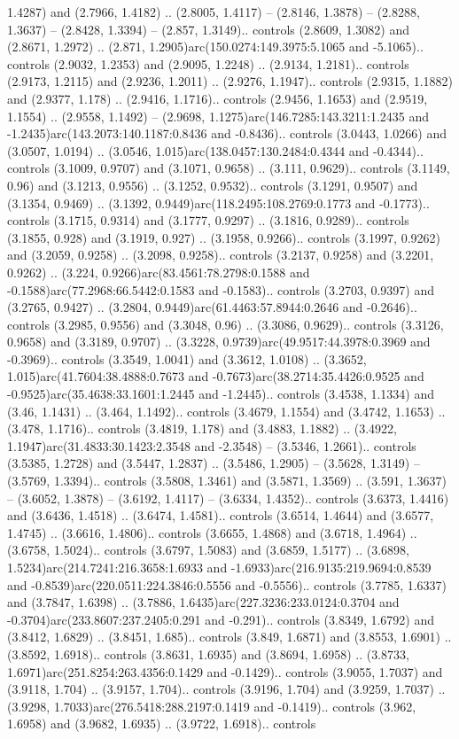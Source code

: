 1.4287) and (2.7966, 1.4182) .. (2.8005, 1.4117) -- (2.8146, 1.3878) -- (2.8288, 1.3637) -- (2.8428, 1.3394) -- (2.857, 1.3149).. controls (2.8609, 1.3082) and (2.8671, 1.2972) .. (2.871, 1.2905)arc(150.0274:149.3975:5.1065 and -5.1065).. controls (2.9032, 1.2353) and (2.9095, 1.2248) .. (2.9134, 1.2181).. controls (2.9173, 1.2115) and (2.9236, 1.2011) .. (2.9276, 1.1947).. controls (2.9315, 1.1882) and (2.9377, 1.178) .. (2.9416, 1.1716).. controls (2.9456, 1.1653) and (2.9519, 1.1554) .. (2.9558, 1.1492) -- (2.9698, 1.1275)arc(146.7285:143.3211:1.2435 and -1.2435)arc(143.2073:140.1187:0.8436 and -0.8436).. controls (3.0443, 1.0266) and (3.0507, 1.0194) .. (3.0546, 1.015)arc(138.0457:130.2484:0.4344 and -0.4344).. controls (3.1009, 0.9707) and (3.1071, 0.9658) .. (3.111, 0.9629).. controls (3.1149, 0.96) and (3.1213, 0.9556) .. (3.1252, 0.9532).. controls (3.1291, 0.9507) and (3.1354, 0.9469) .. (3.1392, 0.9449)arc(118.2495:108.2769:0.1773 and -0.1773).. controls (3.1715, 0.9314) and (3.1777, 0.9297) .. (3.1816, 0.9289).. controls (3.1855, 0.928) and (3.1919, 0.927) .. (3.1958, 0.9266).. controls (3.1997, 0.9262) and (3.2059, 0.9258) .. (3.2098, 0.9258).. controls (3.2137, 0.9258) and (3.2201, 0.9262) .. (3.224, 0.9266)arc(83.4561:78.2798:0.1588 and -0.1588)arc(77.2968:66.5442:0.1583 and -0.1583).. controls (3.2703, 0.9397) and (3.2765, 0.9427) .. (3.2804, 0.9449)arc(61.4463:57.8944:0.2646 and -0.2646).. controls (3.2985, 0.9556) and (3.3048, 0.96) .. (3.3086, 0.9629).. controls (3.3126, 0.9658) and (3.3189, 0.9707) .. (3.3228, 0.9739)arc(49.9517:44.3978:0.3969 and -0.3969).. controls (3.3549, 1.0041) and (3.3612, 1.0108) .. (3.3652, 1.015)arc(41.7604:38.4888:0.7673 and -0.7673)arc(38.2714:35.4426:0.9525 and -0.9525)arc(35.4638:33.1601:1.2445 and -1.2445).. controls (3.4538, 1.1334) and (3.46, 1.1431) .. (3.464, 1.1492).. controls (3.4679, 1.1554) and (3.4742, 1.1653) .. (3.478, 1.1716).. controls (3.4819, 1.178) and (3.4883, 1.1882) .. (3.4922, 1.1947)arc(31.4833:30.1423:2.3548 and -2.3548) -- (3.5346, 1.2661).. controls (3.5385, 1.2728) and (3.5447, 1.2837) .. (3.5486, 1.2905) -- (3.5628, 1.3149) -- (3.5769, 1.3394).. controls (3.5808, 1.3461) and (3.5871, 1.3569) .. (3.591, 1.3637) -- (3.6052, 1.3878) -- (3.6192, 1.4117) -- (3.6334, 1.4352).. controls (3.6373, 1.4416) and (3.6436, 1.4518) .. (3.6474, 1.4581).. controls (3.6514, 1.4644) and (3.6577, 1.4745) .. (3.6616, 1.4806).. controls (3.6655, 1.4868) and (3.6718, 1.4964) .. (3.6758, 1.5024).. controls (3.6797, 1.5083) and (3.6859, 1.5177) .. (3.6898, 1.5234)arc(214.7241:216.3658:1.6933 and -1.6933)arc(216.9135:219.9694:0.8539 and -0.8539)arc(220.0511:224.3846:0.5556 and -0.5556).. controls (3.7785, 1.6337) and (3.7847, 1.6398) .. (3.7886, 1.6435)arc(227.3236:233.0124:0.3704 and -0.3704)arc(233.8607:237.2405:0.291 and -0.291).. controls (3.8349, 1.6792) and (3.8412, 1.6829) .. (3.8451, 1.685).. controls (3.849, 1.6871) and (3.8553, 1.6901) .. (3.8592, 1.6918).. controls (3.8631, 1.6935) and (3.8694, 1.6958) .. (3.8733, 1.6971)arc(251.8254:263.4356:0.1429 and -0.1429).. controls (3.9055, 1.7037) and (3.9118, 1.704) .. (3.9157, 1.704).. controls (3.9196, 1.704) and (3.9259, 1.7037) .. (3.9298, 1.7033)arc(276.5418:288.2197:0.1419 and -0.1419).. controls (3.962, 1.6958) and (3.9682, 1.6935) .. (3.9722, 1.6918).. controls 